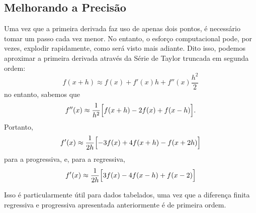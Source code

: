 \documentclass[12pt,openany]{book}
\begin{document}
\subsection{Melhorando a Precisão}
Uma vez que a primeira derivada faz uso de apenas dois pontos, é necessário tomar um passo cada vez menor.
No entanto, o esforço computacional pode, por vezes, explodir rapidamente, como será visto mais adiante.
Dito isso, podemos aproximar a primeira derivada através da Série de Taylor truncada em segunda ordem:
\[
    f(x + h) \approx f(x) + f'(x)h + f''(x)\frac{h^{2}}{2}
\]
no entanto, sabemos que
\[
    f''(x) \approx \frac{1}{h^{2}}\Bigl[ f(x + h) - 2f(x) + f(x - h) \Bigr].
\]
Portanto,
\[
    f'(x) \approx \frac{1}{2h}\Bigl[ -3f(x) + 4f(x + h) - f(x + 2h) \Bigr]
\]
para a progressiva, e, para a regressiva,
\[
    f'(x) \approx \frac{1}{2h}\Bigl[ 3f(x) - 4f(x - h) + f(x - 2) \Bigr]
\]

Isso é particularmente útil para dados tabelados, uma vez que a diferença finita regressiva e progressiva apresentada anteriormente é de primeira ordem.
\end{document}
